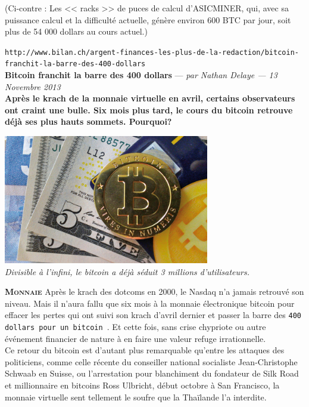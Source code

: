 \documentclass[11pt,twoside,a4paper]{article}
\begin{document}
(Ci-contre : Les << racks >> de puces de calcul d'ASICMINER, qui, avec sa puissance calcul et la difficult{\'e} actuelle, g{\'e}n{\`e}re environ 600 BTC par jour, soit plus de 54 000 dollars au cours actuel.) ~\\


\clearpage

\texttt{http://www.bilan.ch/argent-finances-les-plus-de-la-redaction/bitcoin-franchit-la-barre-des-400-dollars}~\\

\textbf{Bitcoin franchit la barre des 400 dollars} --- \emph{\small par Nathan Delaye --- 13 Novembre 2013 }~\\

\textbf{Apr{\`e}s le krach de la monnaie virtuelle en avril, certains observateurs ont craint une bulle. Six mois plus tard, le cours du bitcoin retrouve d{\'e}j{\`a} ses plus hauts sommets. Pourquoi? } ~\\

\begin{minipage}[ht]{9.25cm}
	\includegraphics[width=9.00cm]{img/bitcoin_money.jpg}~\\
	\emph{Divisible {\`a} l'infini, le bitcoin a d{\'e}j{\`a} s{\'e}duit 3 millions d'utilisateurs. }~\\
\end{minipage} \hfill \begin{minipage}[ht]{10.00cm}
	\textbf{\textsc{Monnaie}} Apr{\`e}s le krach des dotcoms en 2000, le Nasdaq n'a jamais retrouv{\'e} son niveau. Mais il n'aura fallu que six mois {\`a} la monnaie {\'e}lectronique bitcoin pour effacer les pertes qui ont suivi son krach d'avril dernier et passer la barre des \texttt{400 dollars pour un bitcoin~\footnotemark}. Et cette fois, sans crise chypriote ou autre {\'e}v{\'e}nement financier de nature {\`a} en faire une valeur refuge irrationnelle. ~\\
	
	Ce retour du bitcoin est d'autant plus remarquable qu'entre les attaques des politiciens, comme celle r{\'e}cente du conseiller national socialiste Jean-Christophe Schwaab en Suisse, ou l'arrestation pour blanchiment du fondateur de Silk Road et millionnaire en bitcoins Ross Ulbricht, d{\'e}but octobre {\`a} San Francisco, la monnaie virtuelle sent tellement le soufre que la Tha{\"i}lande l'a interdite. ~\\ 
\end{minipage}~\\
\end{document}

